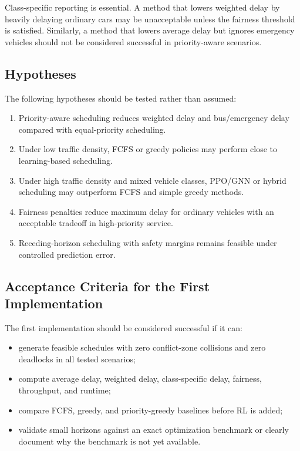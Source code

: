 Class-specific reporting is essential. A method that lowers weighted delay by heavily delaying ordinary cars may be unacceptable unless the fairness threshold is satisfied. Similarly, a method that lowers average delay but ignores emergency vehicles should not be considered successful in priority-aware scenarios.

\subsection{Hypotheses}

The following hypotheses should be tested rather than assumed:
\begin{enumerate}
    \item Priority-aware scheduling reduces weighted delay and bus/emergency delay compared with equal-priority scheduling.
    \item Under low traffic density, FCFS or greedy policies may perform close to learning-based scheduling.
    \item Under high traffic density and mixed vehicle classes, PPO/GNN or hybrid scheduling may outperform FCFS and simple greedy methods.
    \item Fairness penalties reduce maximum delay for ordinary vehicles with an acceptable tradeoff in high-priority service.
    \item Receding-horizon scheduling with safety margins remains feasible under controlled prediction error.
\end{enumerate}

\subsection{Acceptance Criteria for the First Implementation}

The first implementation should be considered successful if it can:
\begin{itemize}
    \item generate feasible schedules with zero conflict-zone collisions and zero deadlocks in all tested scenarios;
    \item compute average delay, weighted delay, class-specific delay, fairness, throughput, and runtime;
    \item compare FCFS, greedy, and priority-greedy baselines before RL is added;
    \item validate small horizons against an exact optimization benchmark or clearly document why the benchmark is not yet available.
\end{itemize}


